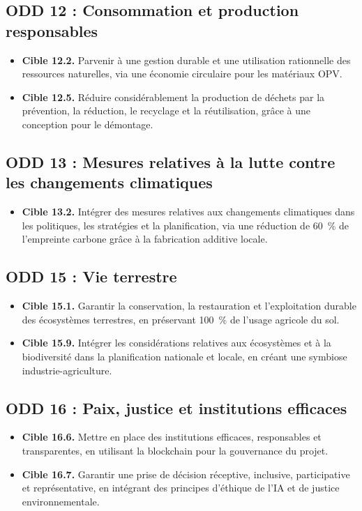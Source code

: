 \documentclass[12pt, a4paper]{article}
\begin{document}
\subsection{ODD 12 : Consommation et production responsables}
\begin{itemize}
    \item \textbf{Cible 12.2.} Parvenir à une gestion durable et une utilisation rationnelle des ressources naturelles, via une économie circulaire pour les matériaux OPV.

    \item \textbf{Cible 12.5.} Réduire considérablement la production de déchets par la prévention, la réduction, le recyclage et la réutilisation, grâce à une conception pour le démontage.
\end{itemize}

\subsection{ODD 13 : Mesures relatives à la lutte contre les changements climatiques}
\begin{itemize}
    \item \textbf{Cible 13.2.} Intégrer des mesures relatives aux changements climatiques dans les politiques, les stratégies et la planification, via une réduction de \SI{60}{\percent} de l'empreinte carbone grâce à la fabrication additive locale.
\end{itemize}

\subsection{ODD 15 : Vie terrestre}
\begin{itemize}
    \item \textbf{Cible 15.1.} Garantir la conservation, la restauration et l'exploitation durable des écosystèmes terrestres, en préservant \SI{100}{\percent} de l'usage agricole du sol.

    \item \textbf{Cible 15.9.} Intégrer les considérations relatives aux écosystèmes et à la biodiversité dans la planification nationale et locale, en créant une symbiose industrie-agriculture.
\end{itemize}

\subsection{ODD 16 : Paix, justice et institutions efficaces}
\begin{itemize}
    \item \textbf{Cible 16.6.} Mettre en place des institutions efficaces, responsables et transparentes, en utilisant la blockchain pour la gouvernance du projet.

    \item \textbf{Cible 16.7.} Garantir une prise de décision réceptive, inclusive, participative et représentative, en intégrant des principes d'éthique de l'IA et de justice environnementale.
\end{itemize}
\end{document}
